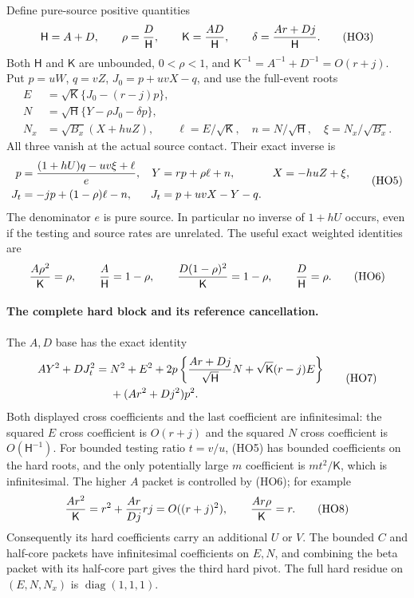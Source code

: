 Define pure-source positive quantities
\[
 \mathsf H=A+D,\qquad \rho={D\over\mathsf H},\qquad
 \mathsf K={AD\over\mathsf H},\qquad
 \delta={Ar+Dj\over\mathsf H}.
 \tag{HO3}
\]
Both $\mathsf H$ and $\mathsf K$ are unbounded,
$0<\rho<1$, and
$\mathsf K^{-1}=A^{-1}+D^{-1}=O(r+j)$.
Put $p=uW$, $q=vZ$, $J_0=p+uvX-q$, and use the full-event roots
\[
 \begin{aligned}
 E&=\sqrt{\mathsf K}\{J_0-(r-j)p\},\\
 N&=\sqrt{\mathsf H}\{Y-\rho J_0-\delta p\},\\
 N_x&=\sqrt{B_x}(X+huZ),\qquad
 \ell=E/\sqrt{\mathsf K},\quad n=N/\sqrt{\mathsf H},
 \quad \xi=N_x/\sqrt{B_x}.
 \end{aligned}
 \tag{HO4}
\]
All three vanish at the actual source contact. Their exact inverse is
\[
 \begin{aligned}
 p&={(1+hU)q-uv\xi+\ell\over e},&
 Y&=rp+\rho\ell+n,&X&=-huZ+\xi,\\
 J_t&=-jp+(1-\rho)\ell-n,&J_t&=p+uvX-Y-q .
 \end{aligned}
 \tag{HO5}
\]
The denominator $e$ is pure source. In particular no inverse of
$1+hU$ occurs, even if the testing and source rates are unrelated.
The useful exact weighted identities are
\[
 {A\rho^2\over\mathsf K}=\rho,\qquad
 {A\over\mathsf H}=1-\rho,\qquad
 {D(1-\rho)^2\over\mathsf K}=1-\rho,\qquad
 {D\over\mathsf H}=\rho .
 \tag{HO6}
\]

\paragraph{The complete hard block and its reference cancellation.}
The $A,D$ base has the exact identity
\[
 \begin{split}
 AY^2+DJ_t^2={}&N^2+E^2
 +2p\left\{{Ar+Dj\over\sqrt{\mathsf H}}N
                 +\sqrt{\mathsf K}(r-j)E\right\}\\
 &+(Ar^2+Dj^2)p^2 .
 \end{split}
 \tag{HO7}
\]
Both displayed cross coefficients and the last coefficient are
infinitesimal: the squared $E$ cross coefficient is $O(r+j)$
and the squared $N$ cross coefficient is $O(\mathsf H^{-1})$.
For bounded testing ratio $t=v/u$, (HO5) has bounded coefficients
on the hard roots, and the only potentially large $m$ coefficient is
$mt^2/\mathsf K$, which is infinitesimal.
The higher $A$ packet is controlled by (HO6); for example
\[
 {Ar^2\over\mathsf K}=r^2+{Ar\over Dj}rj=O((r+j)^2),
 \qquad {Ar\rho\over\mathsf K}=r .
 \tag{HO8}
\]
Consequently its hard coefficients carry an additional $U$ or $V$.
The bounded $C$ and half-core packets have infinitesimal coefficients
on $E,N$, and combining the beta packet with its half-core part gives
the third hard pivot. The full hard residue on $(E,N,N_x)$ is
$\operatorname{diag}(1,1,1)$.

